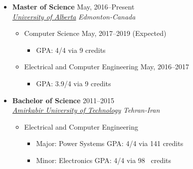 \begin{itemize}
	\item \textbf{Master of Science} \hfill May, 2016--Present \\ 
	\href{https://ualberta.ca/}{ \emph{University of Alberta}} \hfill \emph{Edmonton-Canada}
	\begin{itemize}
		\item Computer Science \hspace{10 pt}  \hspace{10 pt}  \hfill  May, 2017–2019 (Expected)
		\begin{itemize}
			\item GPA: 4/4 via 9 credits \\
		\end{itemize}
		\item Electrical and Computer Engineering \hspace{10 pt}  \hspace{10 pt}  \hfill  May, 2016–2017 
		\begin{itemize}
			\item GPA: 3.9/4 via 9 credits \\
		\end{itemize}
	\end{itemize}
	
	
	\item \textbf{Bachelor of Science} \hfill 2011--2015 \\
	\href{http://aut.ac.ir/aut/}{ \emph{Amirkabir University of Technology}} \hfill \emph{Tehran-Iran}

	\begin{itemize}
		\item Electrical and Computer Engineering
		\begin{itemize}		
		\item Major: Power Systems \hspace{10 pt} \hfill GPA: 4/4 via 141 credits
		\item Minor: Electronics \hspace{36 pt}  \hfill GPA: 4/4 via 98\textcolor{white}{1} credits \\
		\end{itemize}
	\end{itemize}

\end{itemize}
